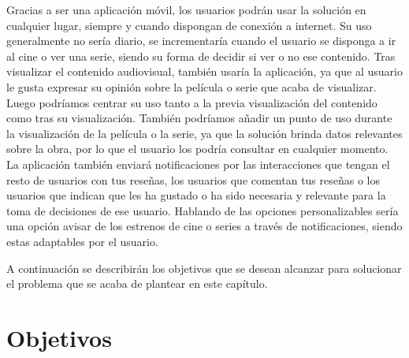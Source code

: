 Gracias a ser una aplicación móvil, los usuarios podrán usar la solución en cualquier lugar, siempre y 
cuando dispongan de conexión a internet. Su uso generalmente no sería diario, se incrementaría cuando 
el usuario se disponga a ir al cine o ver una serie, siendo su forma de decidir si ver o no ese 
contenido. Tras visualizar el contenido audiovisual, también usaría la aplicación, ya que al usuario le 
gusta expresar su opinión sobre la película o serie que acaba de visualizar. Luego podríamos centrar su 
uso tanto a la previa visualización del contenido como tras su visualización. También podríamos añadir 
un punto de uso durante la visualización de la película o la serie, ya que la solución brinda datos 
relevantes sobre la obra, por lo que el usuario los podría consultar en cualquier momento. La 
aplicación también enviará notificaciones por las interacciones que tengan el resto de usuarios con tus 
reseñas, los usuarios que comentan tus reseñas o los usuarios que indican que les ha gustado o ha sido 
necesaria y relevante para la toma de decisiones de ese usuario. Hablando de las opciones 
personalizables sería una opción avisar de los estrenos de cine o series a través de notificaciones, 
siendo estas adaptables por el usuario.

A continuación se describirán los objetivos que se desean alcanzar para solucionar el problema que se 
acaba de plantear en este capítulo.

\section{Objetivos}

